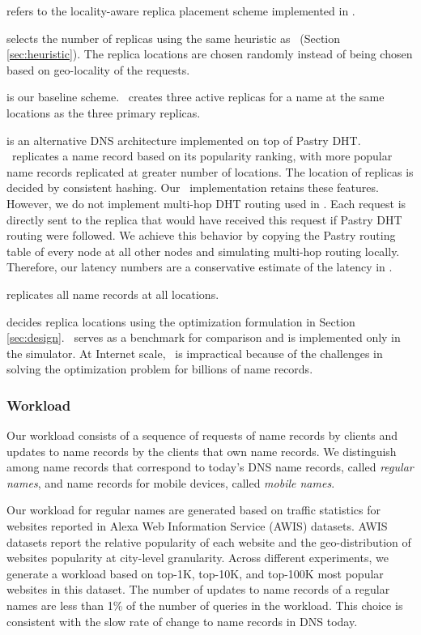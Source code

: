 \textbf{\locaware} refers to the locality-aware replica placement scheme implemented in \auspice. 

\textbf{\uniform} selects the number of replicas using the same heuristic as \locaware\ (Section \ref{sec:heuristic}). The replica locations are chosen randomly instead of being chosen based on geo-locality of the requests.

\textbf{\staticthree} is our baseline scheme. \staticthree\ creates three active replicas for a name at the same locations as the three primary replicas.

\textbf{\codons} is an  alternative DNS architecture implemented on top of Pastry DHT. \codons\ replicates a name record based on its popularity ranking, with more popular name records replicated at greater number of  locations.  The location of replicas is decided by consistent hashing.
Our \codons\ implementation retains these features.
However, we do not implement multi-hop DHT routing used in \codons.
Each request is directly sent to the replica  that would have received this request if Pastry DHT routing were followed.
We achieve this behavior by copying the Pastry routing table of every node at all other nodes and simulating multi-hop routing locally.
Therefore, our latency numbers are a conservative estimate of the latency in \codons. 

\textbf{\replicateall} replicates all name records at all locations.

\textbf{\opt} decides replica locations using the optimization formulation in Section \ref{sec:design}. \opt\ serves as a benchmark for comparison and is implemented only in the simulator. At Internet scale, \opt\ is impractical because of the challenges in solving the optimization problem for billions of name records. 



\subsubsection{Workload}

Our workload consists of a sequence of requests  of name records by clients and updates to name records by the clients that own name records. We distinguish among name records that correspond to today's DNS name records,  called \emph{regular names}, and name records for mobile devices, called  \emph{mobile names}. 

Our workload for regular names are generated based on traffic statistics for websites reported in Alexa Web Information Service \cite{alexa} (AWIS) datasets. AWIS datasets report the relative popularity of each website and the geo-distribution of websites popularity at city-level granularity. 
Across different experiments, we generate a workload based on top-1K, top-10K, and top-100K most popular websites in this dataset. 
The number of updates to name records of a regular names are less than 1\% of the number of queries in the workload. This choice is consistent with the slow rate of change to name records in DNS today.


